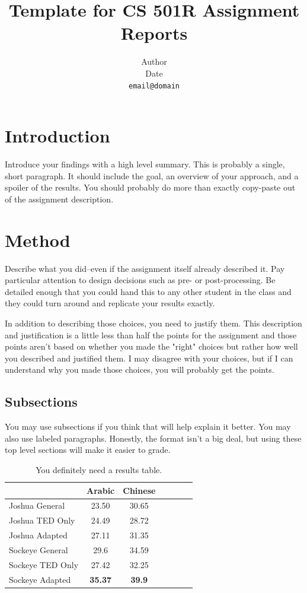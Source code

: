 \documentclass[11pt]{article}
\title{Template for CS 501R Assignment Reports}
\author{Author\\
  Date\\
  {\tt email@domain}}
\date{}
\begin{document}
\maketitle


\section{Introduction}

Introduce your findings with a high level summary. This is probably a single, short paragraph. It should include the goal, an overview of your approach, and a spoiler of the results. You should probably do more than exactly copy-paste out of the assignment description.

\section{Method}

Describe what you did--even if the assignment itself already described it. Pay particular attention to design decisions such as pre- or post-processing. Be detailed enough that you could hand this to any other student in the class and they could turn around and replicate your results exactly. 

In addition to describing those choices, you need to justify them. This description and justification is a little less than half the points for the assignment and those points aren't based on whether you made the "right" choices but rather how well you described and justified them. I may disagree with your choices, but if I can understand why you made those choices, you will probably get the points.

\subsection{Subsections}

You may use subsections if you think that will help explain it better. You may also use labeled paragraphs. Honestly, the format isn't a big deal, but using these top level sections will make it easier to grade.

\begin{table}[htbp]
 \begin{center}
    \begin{tabular}{|l|c|c|c|c|c|c|} \hline 
  & \textbf{Arabic} & \textbf{Chinese} \\
 \hline
Joshua General & 23.50 & 30.65 \\ \hline
Joshua TED Only & 24.49 & 28.72 \\ \hline
Joshua Adapted & 27.11 & 31.35 \\ \hline
Sockeye General & 29.6 & 34.59  \\ \hline
Sockeye TED Only & 27.42 & 32.25 \\ \hline
Sockeye Adapted & \textbf{35.37} & \textbf{39.9} \\ \hline
\end{tabular}   
\end{center}
\caption{\label{table:dummytable} You definitely need a results table.}
\end{table}
\end{document}
